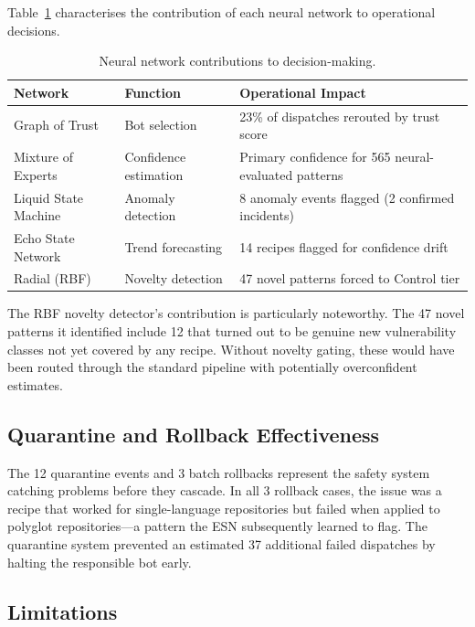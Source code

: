 \documentclass[11pt,a4paper]{article}
\begin{document}
Table~\ref{tab:neural_contrib} characterises the contribution of each neural network to operational decisions.

\begin{table}[htbp]
\centering
\caption{Neural network contributions to decision-making.}
\label{tab:neural_contrib}
\begin{tabular}{@{}lll@{}}
\toprule
\textbf{Network} & \textbf{Function} & \textbf{Operational Impact} \\
\midrule
Graph of Trust & Bot selection & 23\% of dispatches rerouted by trust score \\
Mixture of Experts & Confidence estimation & Primary confidence for 565 neural-evaluated patterns \\
Liquid State Machine & Anomaly detection & 8 anomaly events flagged (2 confirmed incidents) \\
Echo State Network & Trend forecasting & 14 recipes flagged for confidence drift \\
Radial (RBF) & Novelty detection & 47 novel patterns forced to Control tier \\
\bottomrule
\end{tabular}
\end{table}

The RBF novelty detector's contribution is particularly noteworthy. The 47 novel patterns it identified include 12 that turned out to be genuine new vulnerability classes not yet covered by any recipe. Without novelty gating, these would have been routed through the standard pipeline with potentially overconfident estimates.

\subsection{Quarantine and Rollback Effectiveness}

The 12 quarantine events and 3 batch rollbacks represent the safety system catching problems before they cascade. In all 3 rollback cases, the issue was a recipe that worked for single-language repositories but failed when applied to polyglot repositories---a pattern the ESN subsequently learned to flag. The quarantine system prevented an estimated 37 additional failed dispatches by halting the responsible bot early.

\subsection{Limitations}
\end{document}
